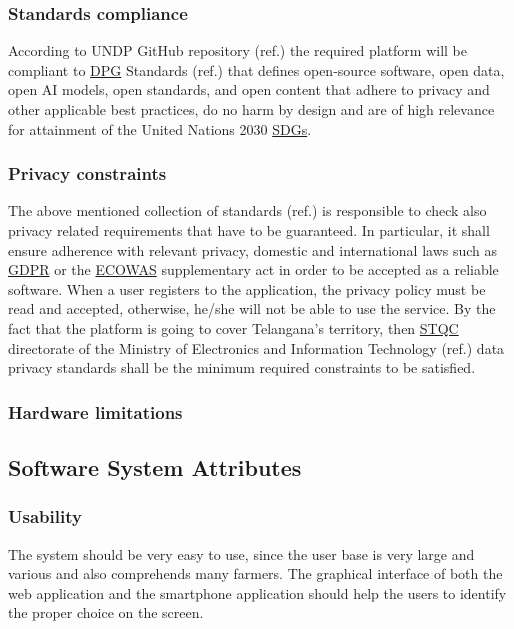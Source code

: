 \subsubsection{Standards compliance}

According to UNDP GitHub repository (ref.\cite{UNDP_GitHub}) the required platform will be compliant to \hyperref[tab:acronymsTable]{DPG} Standards (ref.\cite{DPGS}) that defines open-source software, open data, open AI models, open standards, and open content that adhere to privacy and other applicable best practices, do no harm by design and are of high relevance for attainment of the United Nations 2030 \hyperref[tab:acronymsTable]{SDGs}.

\subsubsection{Privacy constraints}
The above mentioned collection of standards (ref.\cite{DPGS}) is responsible to check also privacy related requirements that have to be guaranteed. In particular, it shall ensure adherence with relevant privacy, domestic and international laws such as \hyperref[tab:acronymsTable]{GDPR} or the \hyperref[tab:acronymsTable]{ECOWAS} supplementary act  in order to be accepted as a reliable software. When a user registers to the application, the privacy policy must be read and accepted, otherwise, he/she will not be able to use the service. By the fact that the platform is going to cover Telangana's territory, then \hyperref[tab:acronymsTable]{STQC} directorate of the Ministry of Electronics and Information Technology (ref.\cite{DPGS}) data privacy standards shall be the minimum required constraints to be satisfied.




\subsubsection{Hardware limitations}

\subsection{Software System Attributes}
\label{sec:sw_sys_attributes}
\subsubsection{Usability}
The system should be very easy to use, since the user base is very large and various and also comprehends many farmers. The graphical interface of both the web application and the smartphone application should help the users to identify the proper choice on the screen.
